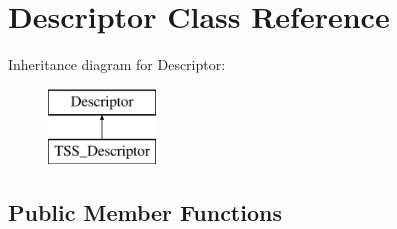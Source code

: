 \hypertarget{classDescriptor}{\section{Descriptor Class Reference}
\label{classDescriptor}
}
Inheritance diagram for Descriptor\-:\begin{figure}[H]
\begin{center}
\leavevmode
\includegraphics[height=2.000000cm]{classDescriptor}
\end{center}
\end{figure}
\subsection*{Public Member Functions}
